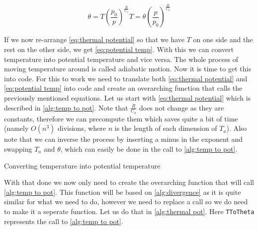 \begin{subequations}
    \begin{equation}
        \theta = T(\frac{p_0}{p})^{\frac{R}{C_a}}
        \label{eq:thermal potential}
    \end{equation}
    \begin{equation}
        T = \theta(\frac{p}{p_0})^{\frac{R}{C_a}}
        \label{eq:potential temp}
    \end{equation}
\end{subequations}

If we now re-arrange \autoref{eq:thermal potential} so that we have $T$ on one side and the rest on the other side, we get \autoref{eq:potential temp}. With this we can convert temperature into 
potential temperature and vice versa. The whole process of moving temperature around is called adiabatic motion. Now it is time to get this into code. For this to work we need to translate both 
\autoref{eq:thermal potential} and \autoref{eq:potential temp} into code and create an overarching function that calls the previously mentioned equations. Let us start with 
\autoref{eq:thermal potential} which is described in \autoref{alg:temp to pot}. Note that $\frac{R}{C_a}$ does not change as they are constants, therefore we can precompute them which saves quite 
a bit of time (namely $O(n^3)$ divisions, where $n$ is the length of each dimension of $T_a$). Also note that we can inverse the process by inserting a minus in the exponent and swapping $T_a$ 
and $\theta$, which can easily be done in the call to \autoref{alg:temp to pot}.

\begin{algorithm}
    \Return{$\theta$}
    \caption{Converting temperature into potential temperature}
    \label{alg:temp to pot}
\end{algorithm}

With that done we now only need to create the overarching function that will call \autoref{alg:temp to pot}. This function will be based on \autoref{alg:divergence} as it is quite similar for 
what we need to do, however we need to replace a call so we do need to make it a seperate function. Let us do that in \autoref{alg:thermal pot}. Here \texttt{TToTheta} represents the call to 
\autoref{alg:temp to pot}.

